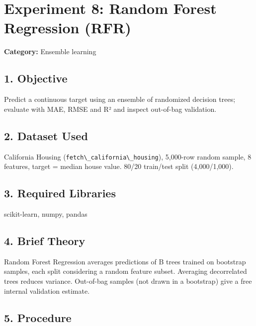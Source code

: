 
\chapter{Experiment 8: Random Forest Regression
(RFR)}\label{experiment-8-random-forest-regression-rfr}

\textbf{Category:} Ensemble learning

\section{1. Objective}\label{objective}

Predict a continuous target using an ensemble of randomized decision
trees; evaluate with MAE, RMSE and R² and inspect out-of-bag validation.

\section{2. Dataset Used}\label{dataset-used}

California Housing
(\passthrough{\lstinline!fetch\_california\_housing!}), 5,000-row random
sample, 8 features, target = median house value. 80/20 train/test split
(4,000/1,000).

\section{3. Required Libraries}\label{required-libraries}

scikit-learn, numpy, pandas

\section{4. Brief Theory}\label{brief-theory}

Random Forest Regression averages predictions of B trees trained on
bootstrap samples, each split considering a random feature subset.
Averaging decorrelated trees reduces variance. Out-of-bag samples (not
drawn in a bootstrap) give a free internal validation estimate.

\section{5. Procedure}\label{procedure}

